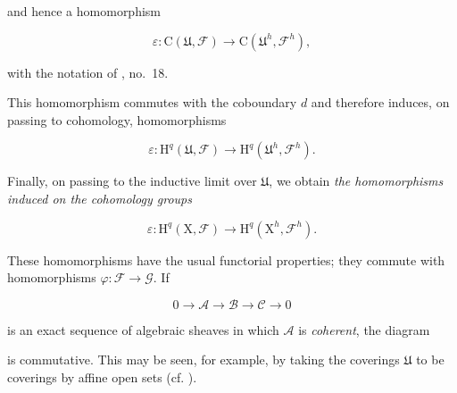 and hence a homomorphism

\begin{equation*}
\varepsilon:\mathrm{C}(\mathfrak{U},\mathcal{F})\longrightarrow \mathrm{C}(\mathfrak{U}^h,\mathcal{F}^h),
\end{equation*}

with the notation of , no.~18.

This homomorphism commutes with the coboundary $d$ and therefore induces, on passing to cohomology, homomorphisms

\begin{equation*}
\varepsilon:\mathrm{H}^q(\mathfrak{U},\mathcal{F})
\longrightarrow
\mathrm{H}^q(\mathfrak{U}^h,\mathcal{F}^h).
\end{equation*}

Finally, on passing to the inductive limit over $\mathfrak{U}$, we obtain \emph{the homomorphisms induced on the cohomology groups}

\begin{equation*}
\varepsilon:\mathrm{H}^q(\mathrm{X},\mathcal{F})
\longrightarrow
\mathrm{H}^q(\mathrm{X}^h,\mathcal{F}^h).
\end{equation*}

These homomorphisms have the usual functorial properties; they commute with homomorphisms $\varphi:\mathcal{F}\to\mathcal{G}$. If

\begin{equation*}
0\longrightarrow\mathcal{A}\longrightarrow\mathcal{B}\longrightarrow\mathcal{C}\longrightarrow0
\end{equation*}

is an exact sequence of algebraic sheaves in which $\mathcal{A}$ is \emph{coherent}, the diagram

\begin{center}
\end{center}

is commutative. This may be seen, for example, by taking the coverings $\mathfrak{U}$ to be coverings by affine open sets (cf. ).


